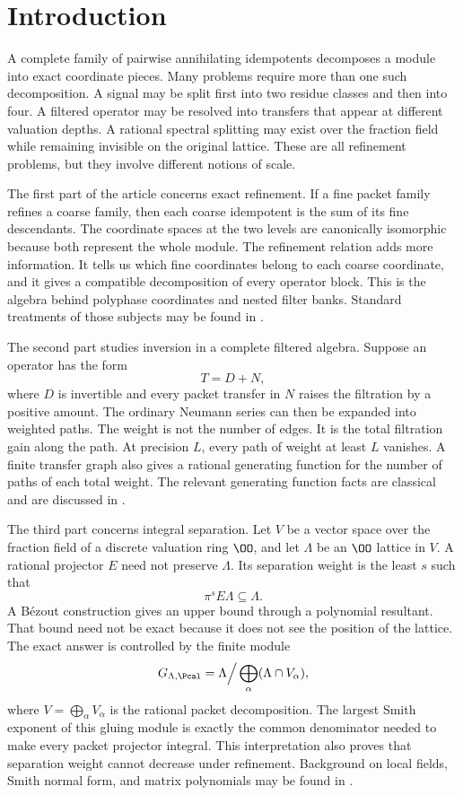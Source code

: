 \section{Introduction}

A complete family of pairwise annihilating idempotents decomposes a module into exact coordinate pieces.  Many problems require more than one such decomposition.  A signal may be split first into two residue classes and then into four.  A filtered operator may be resolved into transfers that appear at different valuation depths.  A rational spectral splitting may exist over the fraction field while remaining invisible on the original lattice.  These are all refinement problems, but they involve different notions of scale.

The first part of the article concerns exact refinement.  If a fine packet family refines a coarse family, then each coarse idempotent is the sum of its fine descendants.  The coordinate spaces at the two levels are canonically isomorphic because both represent the whole module.  The refinement relation adds more information.  It tells us which fine coordinates belong to each coarse coordinate, and it gives a compatible decomposition of every operator block.  This is the algebra behind polyphase coordinates and nested filter banks.  Standard treatments of those subjects may be found in \cite{Vaidyanathan1993,Daubechies1992}.

The second part studies inversion in a complete filtered algebra.  Suppose an operator has the form
\[
T=D+N,
\]
where $D$ is invertible and every packet transfer in $N$ raises the filtration by a positive amount.  The ordinary Neumann series can then be expanded into weighted paths.  The weight is not the number of edges.  It is the total filtration gain along the path.  At precision $L$, every path of weight at least $L$ vanishes.  A finite transfer graph also gives a rational generating function for the number of paths of each total weight.  The relevant generating function facts are classical and are discussed in \cite{Stanley2012}.

The third part concerns integral separation.  Let $V$ be a vector space over the fraction field of a discrete valuation ring $\OO$, and let $\Lambda$ be an $\OO$ lattice in $V$.  A rational projector $E$ need not preserve $\Lambda$.  Its separation weight is the least $s$ such that
\[
\pi^sE\Lambda\subseteq\Lambda.
\]
A Bézout construction gives an upper bound through a polynomial resultant.  That bound need not be exact because it does not see the position of the lattice.  The exact answer is controlled by the finite module
\[
G_{\Lambda,\Pcal}
=
\Lambda\Big/\bigoplus_{\alpha}(\Lambda\cap V_\alpha),
\]
where $V=\bigoplus_\alpha V_\alpha$ is the rational packet decomposition.  The largest Smith exponent of this gluing module is exactly the common denominator needed to make every packet projector integral.  This interpretation also proves that separation weight cannot decrease under refinement.  Background on local fields, Smith normal form, and matrix polynomials may be found in \cite{Serre1979,Newman1972,GohbergLancasterRodman2009}.

